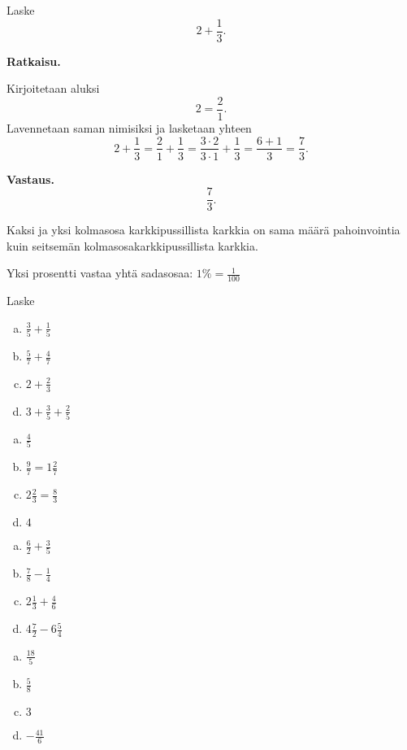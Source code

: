 
\begin{esimerkki}
Laske
\[
2 + \frac{1}{3}.
\]

{\bf Ratkaisu.}

Kirjoitetaan aluksi
\[
2=\frac{2}{1}.
\]
Lavennetaan saman nimisiksi ja lasketaan yhteen
\[
2 + \frac{1}{3} = \frac{2}{1} + \frac{1}{3} = \frac{3 \cdot 2}{3 \cdot 1} + \frac{1}{3} = \frac{6+1}{3} = \frac{7}{3}.
\]

{\bf Vastaus.}
\[
\frac{7}{3}.
\]
\end{esimerkki}


Kaksi ja yksi kolmasosa karkkipussillista karkkia on sama määrä pahoinvointia kuin seitsemän kolmasosakarkkipussillista karkkia.


Yksi prosentti vastaa yhtä sadasosaa: $1 \% = \frac{1}{100}$

Laske %

\begin{tehtava}
\begin{enumerate}[a)]
	\item $\frac{3}{5} + \frac{1}{5}$
	\item $\frac{5}{7} + \frac{4}{7}$
	\item $2 + \frac{2}{3}$
	\item$3 + \frac{3}{5} + \frac{2}{5}$   
\end{enumerate} 
    \begin{vastaus}
		\begin{enumerate}[a)]
			\item $\frac{4}{5}$
			\item $\frac{9}{7} = 1 \frac{2}{7}$
			\item $2 \frac{2}{3} = \frac{8}{3}$
			\item $4$
		\end{enumerate}
    \end{vastaus}
\end{tehtava}

\begin{tehtava}

\begin{enumerate}[a)]
	\item $\frac{6}{2} + \frac{3}{5}$
	\item $\frac{7}{8} - \frac{1}{4}$
	\item $2 \frac{1}{3} + \frac{4}{6}$
	\item $4 \frac{7}{2} - 6 \frac{5}{4}$
\end{enumerate}
    \begin{vastaus}		
		\begin{enumerate}[a)]
			\item $\frac{18}{5}$
			\item $\frac{5}{8}$
			\item $3$
			\item $-\frac{41}{6}$ 
		\end{enumerate}
    \end{vastaus}
\end{tehtava}

